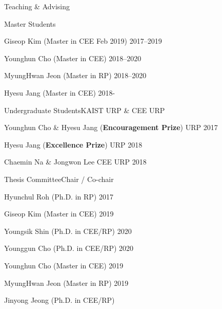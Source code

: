\begin{rSection}{Teaching \& Advising}
\begin{rSubsection}{Master Students}{}{}{}
  \item Giseop Kim (Master in \ac{CEE} Feb 2019) \hfill 2017--2019
  \item Younghun Cho (Master in \ac{CEE}) \hfill 2018--2020
  \item MyungHwan Jeon (Master in \ac{RP}) \hfill 2018--2020
  \item Hyesu Jang (Master in \ac{CEE}) \hfill 2018-
\end{rSubsection}

\begin{rSubsection}{Undergraduate Students}{}{KAIST \acf{URP} \& CEE URP}{}
  \item Younghun Cho \& Hyesu Jang ({\bf Encouragement Prize}) \hfill URP 2017
  \item Hyesu Jang ({\bf Excellence Prize}) \hfill URP 2018
  \item Chaemin Na \& Jongwon Lee \hfill CEE URP 2018
\end{rSubsection}

\begin{rSubsection}{Thesis Committee}{}{Chair / Co-chair }{}
  \item Hyunchul Roh (Ph.D. in \ac{RP}) \hfill 2017
  \item Giseop Kim (Master in \ac{CEE}) \hfill 2019
  \item Youngsik Shin (Ph.D. in \ac{CEE}/\ac{RP}) \hfill 2020
  \item Younggun Cho (Ph.D. in \ac{CEE}/\ac{RP}) \hfill 2020
  \item Younghun Cho (Master in \ac{CEE}) \hfill 2019
  \item MyungHwan Jeon (Master in \ac{RP}) \hfill 2019
  \item Jinyong Jeong (Ph.D. in \ac{CEE}/\ac{RP})
\end{rSubsection}

\end{rSection}
